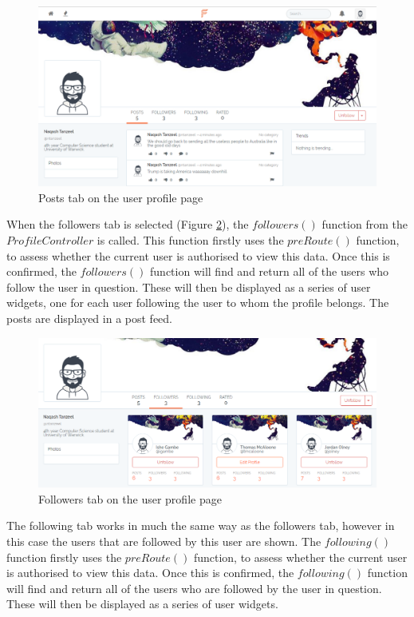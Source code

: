 \begin{figure}[H]
\centering
\includegraphics[width=\textwidth]{Images/Implementation/ProfilePosts}
\caption{Posts tab on the user profile page}
\label{fig:ProfilePosts}
\end{figure}

When the followers tab is selected (Figure \ref{fig:ProfileFollowers}), the \(followers()\) function from the \(ProfileController\) is called. This function firstly uses the \(preRoute()\) function, to assess whether the current user is authorised to view this data. Once this is confirmed, the \(followers()\) function will find and return all of the users who follow the user in question. These will then be displayed as a series of user widgets, one for each user following the user to whom the profile belongs. The posts are displayed in a post feed.

\begin{figure}[H]
\centering
\includegraphics[width=\textwidth]{Images/Implementation/ProfileFollowers}
\caption{Followers tab on the user profile page}
\label{fig:ProfileFollowers}
\end{figure}

The following tab works in much the same way as the followers tab, however in this case the users that are followed by this user are shown. The \(following()\) function firstly uses the \(preRoute()\) function, to assess whether the current user is authorised to view this data. Once this is confirmed, the \(following()\) function will find and return all of the users who are followed by the user in question. These will then be displayed as a series of user widgets.

